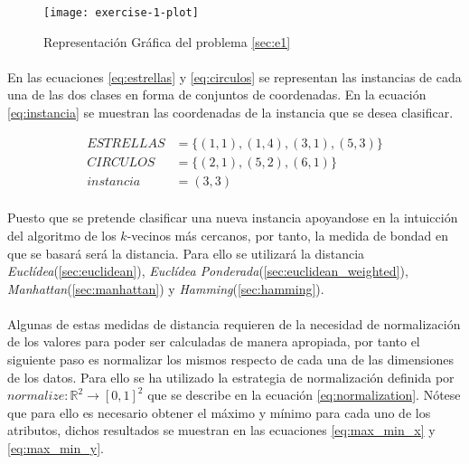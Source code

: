 \documentclass{article}
\begin{document}
		\begin{figure}
			\begin{center}
				\texttt{[image: exercise-1-plot]}
			\end{center}
			\caption{Representación Gráfica del problema \ref{sec:e1}}
			\label{e1:plot}
		\end{figure}

		\paragraph{}
		En las ecuaciones \eqref{eq:estrellas} y \eqref{eq:circulos} se representan las instancias de cada una de las dos clases en forma de conjuntos de coordenadas. En la ecuación \eqref{eq:instancia} se muestran las coordenadas de la instancia que se desea clasificar.

		\begin{align}
		\label{eq:estrellas}
			ESTRELLAS &= \{(1,1), (1,4), (3,1), (5,3)\} \\
		\label{eq:circulos}
			CIRCULOS &= \{(2,1), (5,2), (6,1)\} \\
		\label{eq:instancia}
			instancia &= (3,3)
		\end{align}

		\paragraph{}
		Puesto que se pretende clasificar una nueva instancia apoyandose en la intuicción del algoritmo de los $k$-vecinos más cercanos, por tanto, la medida de bondad en que se basará será la distancia. Para ello se utilizará la distancia \emph{Euclídea}(\ref{sec:euclidean}), \emph{Euclídea Ponderada}(\ref{sec:euclidean_weighted}), \emph{Manhattan}(\ref{sec:manhattan}) y \emph{Hamming}(\ref{sec:hamming}).


		\paragraph{}
		Algunas de estas medidas de distancia requieren de la necesidad de normalización de los valores para poder ser calculadas de manera apropiada, por tanto el siguiente paso es normalizar los mismos respecto de cada una de las dimensiones de los datos. Para ello se ha utilizado la estrategia de normalización definida por $normalize \colon \mathbb{R}^2 \to [0,1]^2$ que se describe en la ecuación \eqref{eq:normalization}. Nótese que para ello es necesario obtener el máximo y mínimo para cada uno de los atributos, dichos resultados se muestran en las ecuaciones \eqref{eq:max_min_x} y \eqref{eq:max_min_y}.
\end{document}
